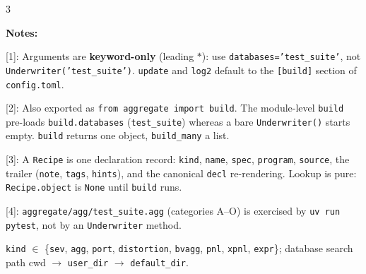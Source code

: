 \begin{multicols*}{3}

\bigskip \raggedright
{\bf Notes:}

[1]: Arguments are \textbf{keyword-only} (leading \texttt{$*$}): use \texttt{databases='test\_suite'}, not \texttt{Underwriter('test\_suite')}. \texttt{update} and \texttt{log2} default to the \texttt{[build]} section of \texttt{config.toml}.

[2]: Also exported as \texttt{from aggregate import build}. The module-level \texttt{build} pre-loads \texttt{build.databases} (\texttt{test\_suite}) whereas a bare \texttt{Underwriter()} starts empty. \texttt{build} returns one object, \texttt{build\_many} a list.

[3]: A \texttt{Recipe} is one declaration record: \texttt{kind}, \texttt{name}, \texttt{spec}, \texttt{program}, \texttt{source}, the trailer (\texttt{note}, \texttt{tags}, \texttt{hints}), and the canonical \texttt{decl} re-rendering. Lookup is pure: \texttt{Recipe.object} is \texttt{None} until \texttt{build} runs.

[4]: \texttt{aggregate/agg/test\_suite.agg} (categories A--O) is exercised by \texttt{uv run pytest}, not by an \texttt{Underwriter} method.

\texttt{kind} $\in$ \{\texttt{sev}, \texttt{agg}, \texttt{port}, \texttt{distortion}, \texttt{bvagg}, \texttt{pnl}, \texttt{xpnl}, \texttt{expr}\}; database search path cwd $\to$ \texttt{user\_dir} $\to$ \texttt{default\_dir}.


\makefooter



\end{multicols*}


